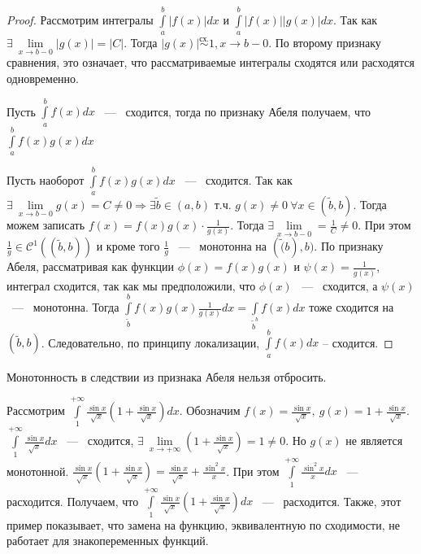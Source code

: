 \begin{proof}
    Рассмотрим интегралы $\int\limits_{a}^{b}|f(x)|dx$ и $\int\limits_{a}^{b}|f(x)||g(x)| dx$. Так как $\exists \ \lim\limits_{x\rightarrow b-0} |g(x)| = |C|$. Тогда $|g(x)| \overset{\text{сх.}}{\sim} 1, x \rightarrow b-0$. По второму признаку сравнения, это означает, что рассматриваемые интегралы сходятся или расходятся одновременно.

    \noindent Пусть $\int\limits_{a}^{b}f(x)dx$ ~---~ сходится, тогда по признаку Абеля получаем, что  $\int\limits_{a}^{b}f(x)g(x)dx$

    \noindent Пусть наоборот $\int\limits_{a}^{b}f(x)g(x)dx$ ~---~ сходится. Так как $\exists \ \lim \limits_{x\rightarrow b-0} g(x) = C \neq 0 \Rightarrow \exists \widetilde{b} \in (a, b)$ т.ч. $g(x) \neq 0 \ \forall x \in (\widetilde{b}, b)$. Тогда можем записать $f(x) = f(x)g(x)\cdot \frac{1}{g(x)}$. Тогда $\exists \lim\limits_{x\rightarrow b-0} = \frac{1}{C} \neq 0$. При этом $\frac{1}{g} \in \mathcal{C}^1((\widetilde{b}, b))$ и кроме того $\frac{1}{g}$ ~---~ монотонна на $(\widetilde(b), b)$. По признаку Абеля, рассматривая как функции $\phi(x) = f(x)g(x)$ и $\psi(x) = \frac{1}{g(x)}$, интеграл сходится, так как мы предположили, что $\phi(x)$ ~---~ сходится, а $\psi(x)$ ~---~ монотонна. Тогда $\int\limits_{\widetilde{b}}^{b}f(x)g(x)\frac{1}{g(x)}dx = \int\limits_{\widetilde{b}^{b}}f(x) dx$ тоже сходится на $(\widetilde{b}, b)$. Следовательно, по принципу локализации, $\int\limits_{a}^{b} f(x)dx$ -- сходится.  
\end{proof}

\begin{corollary}
    Монотонность в следствии из признака Абеля нельзя отбросить. 
\end{corollary}
\begin{example}
    Рассмотрим $\int\limits_{1}^{+\infty} \frac{\sin x}{\sqrt{x}}(1 + \frac{\sin x}{\sqrt{x}}) dx$. Обозначим $f(x) = \frac{\sin x}{\sqrt{x}}, \ g(x) = 1 + \frac{\sin x}{\sqrt{x}}$.  $\int\limits_{1}^{+\infty} \frac{\sin x}{\sqrt{x}} dx$ ~---~ сходится, $\exists \ \lim \limits_{x \rightarrow + \infty} (1 + \frac{\sin x}{\sqrt{x}}) = 1 \neq 0$. Но $g(x)$ не является монотонной. $\frac{\sin x}{\sqrt{x}}(1 + \frac{\sin x}{\sqrt{x}}) = \frac{\sin x}{\sqrt{x}} + \frac{\sin^2x}{x}$. При этом $\int\limits_{1}^{+\infty} \frac{\sin^2 x}{x} dx$ ~---~ расходится. Получаем, что $\int\limits_{1}^{+\infty} \frac{\sin x}{\sqrt{x}}(1 + \frac{\sin x}{\sqrt{x}}) dx$ ~---~ расходится. Также, этот пример показывает, что замена на функцию, эквивалентную по сходимости, не работает для знакопеременных функций. 
\end{example}

